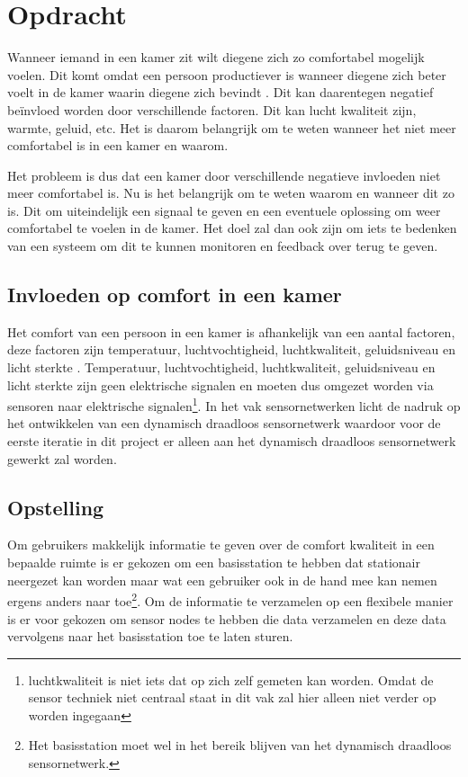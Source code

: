 \section{Opdracht} \label{sec:assignment}
Wanneer iemand in een kamer zit wilt diegene zich zo comfortabel mogelijk voelen. Dit komt omdat een persoon productiever is wanneer diegene zich beter voelt in de kamer waarin diegene zich bevindt \cite{productiviteit}. Dit kan daarentegen negatief beïnvloed worden door verschillende factoren. Dit kan lucht kwaliteit zijn, warmte, geluid, etc. Het is daarom belangrijk om te weten wanneer het niet meer comfortabel is in een kamer en waarom. 

Het probleem is dus dat een kamer door verschillende negatieve invloeden niet meer comfortabel is. Nu is het belangrijk om te weten waarom en wanneer dit zo is. Dit om uiteindelijk een signaal te geven en een eventuele oplossing om weer comfortabel te voelen in de kamer. Het doel zal dan ook zijn om iets te bedenken van een systeem om dit te kunnen monitoren en feedback over terug te geven.

\subsection{Invloeden op comfort in een kamer} \label{sec:influenceOnComfort}
Het comfort van een persoon in een kamer is afhankelijk van een aantal factoren, deze factoren zijn temperatuur, luchtvochtigheid, luchtkwaliteit, geluidsniveau en licht sterkte \cite{productiviteit}. 
Temperatuur, luchtvochtigheid, luchtkwaliteit, geluidsniveau en licht sterkte zijn geen elektrische signalen en moeten dus omgezet worden via sensoren naar elektrische signalen\footnote{luchtkwaliteit is niet iets dat op zich zelf gemeten kan worden. Omdat de sensor techniek niet centraal staat in dit vak zal hier alleen niet verder op worden ingegaan}. In het vak sensornetwerken licht de nadruk op het ontwikkelen van een dynamisch draadloos sensornetwerk waardoor voor de eerste iteratie in dit project er alleen aan het dynamisch draadloos sensornetwerk gewerkt zal worden.

\subsection{Opstelling}
Om gebruikers makkelijk informatie te geven over de comfort kwaliteit in een bepaalde ruimte is er gekozen om een basisstation te hebben dat stationair neergezet kan worden maar wat een gebruiker ook in de hand mee kan nemen ergens anders naar toe\footnote{Het basisstation moet wel in het bereik blijven van het dynamisch draadloos sensornetwerk.}. Om de informatie te verzamelen op een flexibele manier is er voor gekozen om sensor nodes te hebben die data verzamelen en deze data vervolgens naar het basisstation toe te laten sturen.

